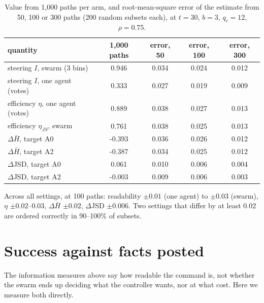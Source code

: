 \documentclass[10pt,a4paper]{article}
\begin{document}
\begin{table}[H]
\centering\small
\caption{Value from 1{,}000 paths per arm, and root-mean-square error of the estimate from 50, 100
or 300 paths (200 random subsets each), at $t = 30$, $b = 3$, $q_c = 12$, $\rho = 0.75$.}
\label{tab:effprec}
\begin{tabular}{lcccc}
\toprule
quantity & 1{,}000 paths & error, 50 & error, 100 & error, 300 \\
\midrule
steering $I$, swarm (3 bins) & 0.946 & 0.034 & 0.024 & 0.012 \\
steering $I$, one agent (votes) & 0.333 & 0.027 & 0.019 & 0.009 \\
efficiency $\eta$, one agent (votes) & 0.889 & 0.038 & 0.027 & 0.013 \\
efficiency $\eta_{JS}$, swarm & 0.761 & 0.038 & 0.025 & 0.013 \\
$\Delta\bar H$, target A0 & -0.393 & 0.036 & 0.026 & 0.012 \\
$\Delta\bar H$, target A2 & -0.387 & 0.034 & 0.025 & 0.012 \\
$\Delta$JSD, target A0 & 0.061 & 0.010 & 0.006 & 0.004 \\
$\Delta$JSD, target A2 & -0.003 & 0.009 & 0.006 & 0.003 \\
\bottomrule
\end{tabular}
\end{table}

\noindent Across all settings, at 100 paths: readability $\pm0.01$ (one agent) to $\pm0.03$ (swarm),
$\eta$ $\pm0.02$--$0.03$, $\Delta\bar H$ $\pm0.02$, $\Delta$JSD $\pm0.006$. Two settings that differ by
at least 0.02 are ordered correctly in 90--100\% of subsets.

\section{Success against facts posted}\label{sec:success}

The information measures above say how readable the command is, not whether the swarm ends up
deciding what the controller wants, nor at what cost. Here we measure both directly.
\end{document}
